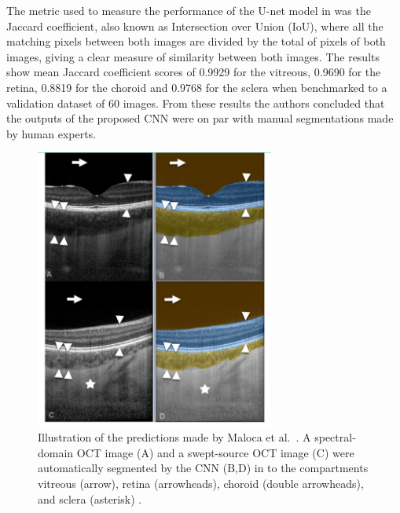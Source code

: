 \documentclass[12pt,a4paper]{scrartcl}
\begin{document}
The metric used to measure the performance of the U-net model in \cite{Maloca2019} was the Jaccard coefficient, also known as Intersection over Union (IoU), where all the matching pixels between both images are divided by the total of pixels of both images, giving a clear measure of similarity between both images. The results show mean Jaccard coefficient scores of 0.9929 for the vitreous, 0.9690 for the retina, 0.8819 for the choroid and 0.9768 for the sclera when benchmarked to a validation dataset of 60 images. From these results the authors concluded that the outputs of the proposed CNN were on par with manual segmentations made by human experts.

\begin{figure}[H]
    \centering
    \includegraphics[width=0.7\textwidth]{./images/maloca-segmentations-results.png}
    \caption{Illustration of the predictions made by Maloca et al.~\cite{Maloca2019}. A spectral-domain OCT image (A) and a swept-source OCT image (C) were automatically segmented by the CNN (B,D) in to the compartments vitreous (arrow), retina (arrowheads), choroid (double arrowheads), and sclera (asterisk) \cite{Maloca2019}.}
\end{figure}
\end{document}

